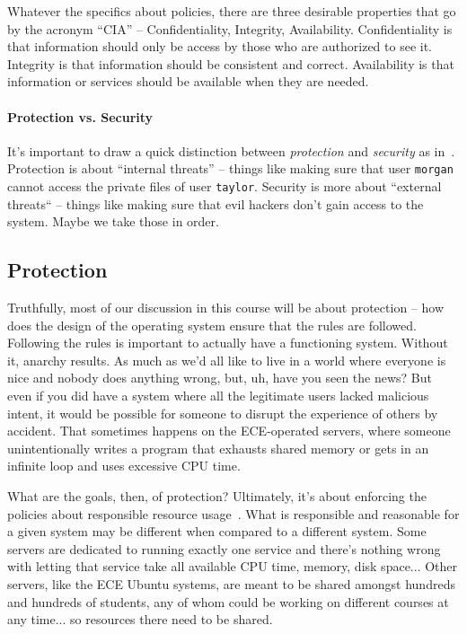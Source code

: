 Whatever the specifics about policies, there are three desirable properties that go by the acronym ``CIA'' -- Confidentiality, Integrity, Availability. Confidentiality is that information should only be access by those who are authorized to see it. Integrity is that information should be consistent and correct. Availability is that information or services should be available when they are needed.

\paragraph{Protection vs. Security} It's important to draw a quick distinction between \textit{protection} and \textit{security} as in~\cite{osc}. Protection is about ``internal threats'' -- things like making sure that user \texttt{morgan} cannot access the private files of user \texttt{taylor}. Security is more about ``external threats`` -- things like making sure that evil hackers don't gain access to the system. Maybe we take those in order.

\subsection*{Protection}
Truthfully, most of our discussion in this course will be about protection -- how does the design of the operating system ensure that the rules are followed. Following the rules is important to actually have a functioning system. Without it, anarchy results. As much as we'd all like to live in a world where everyone is nice and nobody does anything wrong, but, uh, have you seen the news? But even if you did have a system where all the legitimate users lacked malicious intent, it would be possible for someone to disrupt the experience of others by accident. That sometimes happens on the ECE-operated servers, where someone unintentionally writes a program that exhausts shared memory or gets in an infinite loop and uses excessive CPU time.

What are the goals, then, of protection? Ultimately, it's about enforcing the policies about responsible resource usage~\cite{osc}. What is responsible and reasonable for a given system may be different when compared to a different system. Some servers are dedicated to running exactly one service and there's nothing wrong with letting that service take all available CPU time, memory, disk space... Other servers, like the ECE Ubuntu systems, are meant to be shared amongst hundreds and hundreds of students, any of whom could be working on different courses at any time... so resources there need to be shared. 

